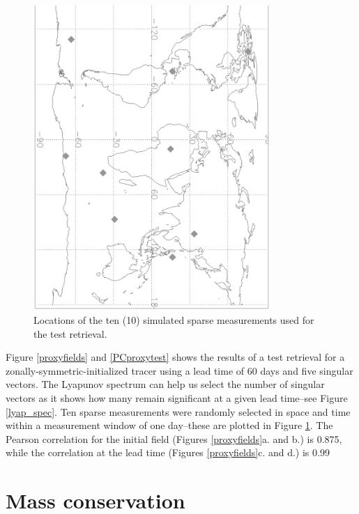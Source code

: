 \documentclass{article}
\begin{document}
\begin{figure}
\begin{center}
\includegraphics[angle=90,width=0.8\textwidth]{../pc_proxy/meas_loc.eps}
\caption{Locations of the ten (10) simulated sparse measurements used for the
test retrieval.}\label{sparse}
\end{center}
\end{figure}

Figure \ref{proxyfields} and \ref{PCproxytest} 
shows the results of a test retrieval for a 
zonally-symmetric-initialized tracer using a lead time of 60 days
and five singular vectors.
The Lyapunov spectrum can help us select the number of singular vectors
as it shows how many remain significant at
a given lead time--see Figure \ref{lyap_spec}.
Ten sparse measurements were randomly selected in space and time
within a measurement window of one day--these are plotted in Figure \ref{sparse}.
The Pearson correlation for the initial field (Figures \ref{proxyfields}a. and b.)
is 0.875, while the correlation at the lead time 
(Figures \ref{proxyfields}c. and d.) is 0.99

\appendix

\section{Mass conservation}
\end{document}
